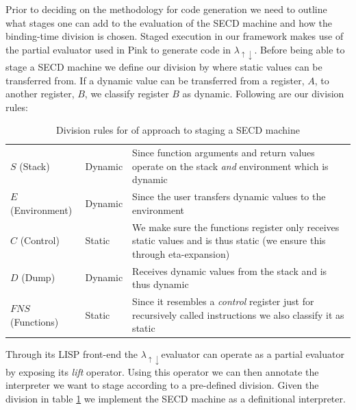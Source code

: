 \documentclass[fleqn]{article}
\theoremstyle{definition}
\newcommand{\mslang}{$\lambda_{\uparrow\downarrow}$}
\begin{document}
Prior to deciding on the methodology for code generation we need to outline what stages one can add to the evaluation of the SECD machine and how the binding-time division is chosen. Staged execution in our framework makes use of the partial evaluator used in Pink \cite{amin2017collapsing} to generate code in \mslang. Before being able to stage a SECD machine we define our division by where static values can be transferred from. If a dynamic value can be transferred from a register, $A$, to another register, $B$, we classify register $B$ as dynamic. Following are our division rules:
\begin{table}[!htbp]
  \centering
  \caption{Division rules for of approach to staging a SECD machine}
  \label{tbl:secd_division}
  \begin{tabular}{|p{3cm}|p{3cm}|p{6cm}|}
 	\toprule
 	\thead{SECD Register}	&	\thead{Classification}	&	\thead{Reason}	\\ \hline

 	\midrule
	$S$ (Stack)				&	Dynamic				&	Since function arguments and return values operate on the stack \textit{and} environment which is dynamic \\ \hline

	$E$ (Environment)		&	Dynamic			&	Since the user transfers dynamic values to the environment \\ \hline

	$C$ (Control)				&	Static				& We make sure the functions register only receives static values and is thus static (we ensure this through eta-expansion)  \\ \hline

	$D$ (Dump)				&	Dynamic				&	Receives dynamic values from the stack and is thus dynamic \\ \hline

	$FNS$ (Functions)		&	Static				&	Since it resembles a \textit{control} register just for recursively called instructions we also classify it as static \\

	\bottomrule
  \end{tabular}
\end{table}

Through its LISP front-end the \mslang evaluator can operate as a partial evaluator by exposing its \textit{lift} operator. Using this operator we can then annotate the interpreter we want to stage according to a pre-defined division. Given the division in table \ref{tbl:secd_division} we implement the SECD machine as a definitional interpreter.
\end{document}
